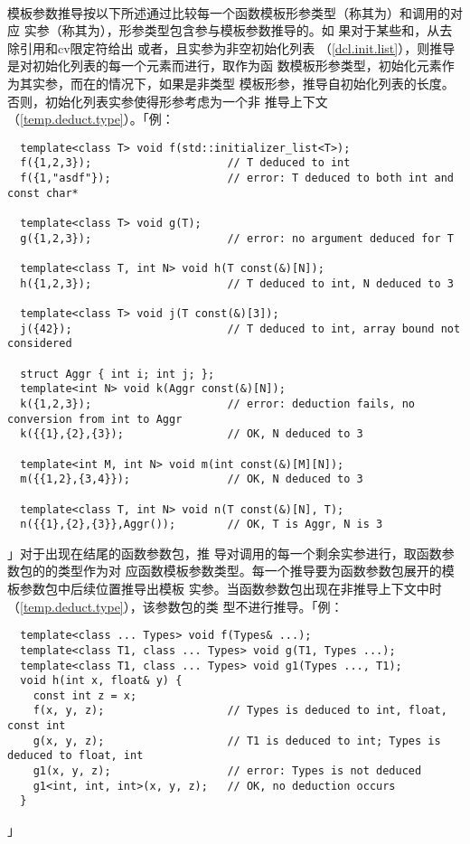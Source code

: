 \paragraph{}
模板参数推导按以下所述通过比较每一个函数模板形参类型（称其为）和调用的对应
实参（称其为），形参类型包含参与模板参数推导的。如
果对于某些和，从去除引用和cv限定符给出
或者，且实参为非空初始化列表
（\ref{dcl.init.list}），则推导是对初始化列表的每一个元素而进行，取作为函
数模板形参类型，初始化元素作为其实参，而在的情况下，如果是非类型
模板形参，推导自初始化列表的长度。否则，初始化列表实参使得形参考虑为一个非
推导上下文（\ref{temp.deduct.type}）。「例：
\begin{lstlisting}
  template<class T> void f(std::initializer_list<T>);
  f({1,2,3});                     // T deduced to int
  f({1,"asdf"});                  // error: T deduced to both int and const char*

  template<class T> void g(T);
  g({1,2,3});                     // error: no argument deduced for T

  template<class T, int N> void h(T const(&)[N]);
  h({1,2,3});                     // T deduced to int, N deduced to 3

  template<class T> void j(T const(&)[3]);
  j({42});                        // T deduced to int, array bound not considered

  struct Aggr { int i; int j; };
  template<int N> void k(Aggr const(&)[N]);
  k({1,2,3});                     // error: deduction fails, no conversion from int to Aggr
  k({{1},{2},{3});                // OK, N deduced to 3

  template<int M, int N> void m(int const(&)[M][N]);
  m({{1,2},{3,4}});               // OK, N deduced to 3

  template<class T, int N> void n(T const(&)[N], T);
  n({{1},{2},{3}},Aggr());        // OK, T is Aggr, N is 3
\end{lstlisting}」对于出现在结尾的函数参数包，推
导对调用的每一个剩余实参进行，取函数参数包的的类型作为对
应函数模板参数类型。每一个推导要为函数参数包展开的模板参数包中后续位置推导出模板
实参。当函数参数包出现在非推导上下文中时（\ref{temp.deduct.type}），该参数包的类
型不进行推导。「例：
\begin{lstlisting}
  template<class ... Types> void f(Types& ...);
  template<class T1, class ... Types> void g(T1, Types ...);
  template<class T1, class ... Types> void g1(Types ..., T1);
  void h(int x, float& y) {
    const int z = x;
    f(x, y, z);                   // Types is deduced to int, float, const int
    g(x, y, z);                   // T1 is deduced to int; Types is deduced to float, int
    g1(x, y, z);                  // error: Types is not deduced
    g1<int, int, int>(x, y, z);   // OK, no deduction occurs
  }
\end{lstlisting}」

